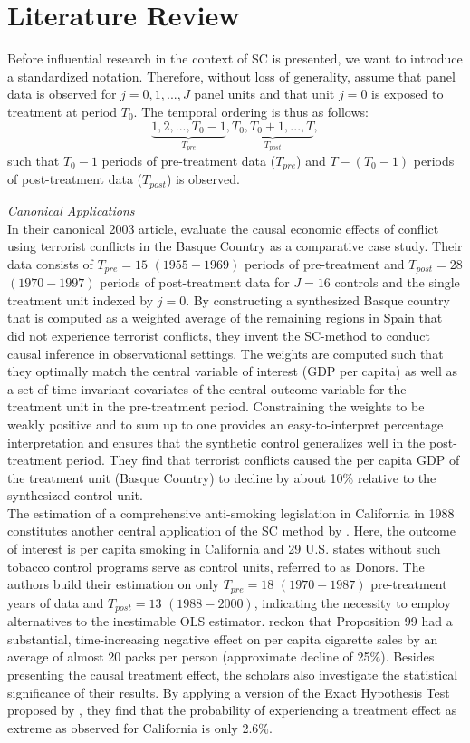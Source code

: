 \section{Literature Review}
\label{Chap2}
Before influential research in the context of \ac{SC} is presented, we want to introduce a standardized notation. Therefore, without loss of generality, assume that panel data is observed for $j = 0,1,...,J$ panel units and that unit $j = 0$ is exposed to treatment at period $T_0$. The temporal ordering is thus as follows:
$$
\underbrace{1,2,..., T_0 -1}_{T_{pre}},  \underbrace{T_0, T_0 +1, ..., T}_{T_{post}},
$$
such that $T_0 -1$ periods of pre-treatment data ($T_{pre}$) and $T-(T_0 -1)$ periods of post-treatment data ($T_{post}$) is observed.

\textit{Canonical Applications}\\
In their canonical 2003 article, \cite{abadie:2003} evaluate the causal economic effects of conflict using terrorist conflicts in the Basque Country as a comparative case study. Their data consists of $T_{pre} = 15$ $(1955-1969)$ periods of pre-treatment and $T_{post} = 28$  $(1970-1997)$ periods of post-treatment data for $J = 16$ controls and the single treatment unit indexed by $j = 0$. By constructing a synthesized Basque country that is computed as a weighted average of  the remaining regions in Spain that did not experience terrorist conflicts, they invent the \ac{SC}-method to conduct causal inference in observational settings. The weights are computed such that they optimally match the central variable of interest (\ac{GDP} per capita) as well as a set of time-invariant covariates of the central outcome variable for the treatment unit in the pre-treatment period. Constraining the weights to be weakly positive and to sum up to one provides an easy-to-interpret percentage interpretation and ensures that the synthetic control generalizes well in the post-treatment period. They find that terrorist conflicts caused the per capita \ac{GDP} of the treatment unit (Basque Country) to decline by about 10\% relative to the synthesized control unit. \\
The estimation of a comprehensive anti-smoking legislation in California in 1988 constitutes another central application of the \ac{SC} method by \cite{abadie:2010}. Here, the outcome of interest is per capita smoking in California and 29 U.S. states without such tobacco control programs serve as control units, referred to as Donors. The authors build their estimation on only $T_{pre} = 18$ $(1970-1987)$ pre-treatment years of data and $T_{post} = 13$ $(1988-2000)$, indicating the necessity to employ alternatives to the inestimable \ac{OLS} estimator. \cite{abadie:2010} reckon that Proposition 99 had a substantial, time-increasing negative effect on per capita cigarette sales by an average of almost 20 packs per person (approximate decline of 25\%). Besides presenting the causal treatment effect, the scholars also investigate the statistical significance of their results. By applying a version of the Exact Hypothesis Test proposed by \cite{fisher:1971}, they find that the probability of experiencing a treatment effect as extreme as observed for California is only 2.6\%.\\
